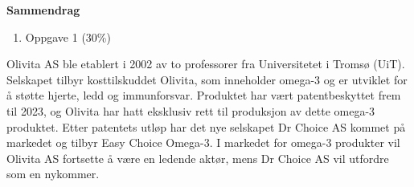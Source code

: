 \documentclass[
  12pt,
  a4paper,
  DIV=11,
  numbers=noendperiod]{scrartcl}
\providecommand{\tightlist}{%
  \setlength{\itemsep}{0pt}\setlength{\parskip}{0pt}}\usepackage{longtable,booktabs,array}
\renewcommand*\contentsname{Table of contents}
\newcommand\contentsname{Table of contents}
\begin{document}







\thispagestyle{plain}
\begin{center}
    \Large
    \textbf{Sammendrag}
\end{center}



\newpage
\hypersetup{linkcolor=black}
\renewcommand{\contentsname}{Innholdsfortegnelse}
\renewcommand*{\figureautorefname}{Figur}
\renewcommand*{\tableautorefname}{Tabell}
\tableofcontents
\listoffigures
\listoftables
\hypersetup{linkcolor=blue}
\newpage

\begin{enumerate}
\def\labelenumi{\arabic{enumi}.}
\tightlist
\item
  Oppgave 1 (30\%)
\end{enumerate}

Olivita AS ble etablert i 2002 av to professorer fra Universitetet i
Tromsø (UiT). Selskapet tilbyr kosttilskuddet Olivita, som inneholder
omega-3 og er utviklet for å støtte hjerte, ledd og immunforsvar.
Produktet har vært patentbeskyttet frem til 2023, og Olivita har hatt
eksklusiv rett til produksjon av dette omega-3 produktet. Etter
patentets utløp har det nye selskapet Dr Choice AS kommet på markedet og
tilbyr Easy Choice Omega-3. I markedet for omega-3 produkter vil Olivita
AS fortsette å være en ledende aktør, mens Dr Choice AS vil utfordre som
en nykommer.
\end{document}
